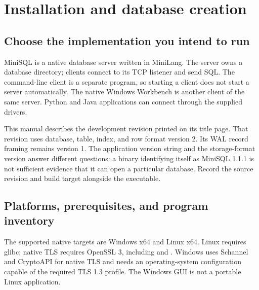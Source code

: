 \chapter{Installation and database creation}
\label{ops:installation}

\section{Choose the implementation you intend to run}

MiniSQL is a native database server written in MiniLang. The server owns a
database directory; clients connect to its TCP listener and send SQL. The
command-line client is a separate program, so starting a client does not start
a server automatically. The native Windows Workbench is another client of the
same server. Python and Java applications can connect through the supplied
drivers.

This manual describes the development revision printed on its title page.
That revision uses database, table, index, and row format version 2. Its WAL
record framing remains version 1. The application version string and the
storage-format version answer different questions: a binary identifying
itself as MiniSQL 1.1.1 is not sufficient evidence that it can open a
particular database. Record the source revision and build target alongside
the executable.



\section{Platforms, prerequisites, and program inventory}

The supported native targets are Windows x64 and Linux x64. Linux requires
glibc; native TLS requires OpenSSL 3, including  and
. Windows uses Schannel and CryptoAPI for native TLS and
needs an operating-system configuration capable of the required TLS 1.3
profile. The Windows GUI is not a portable Linux application.

